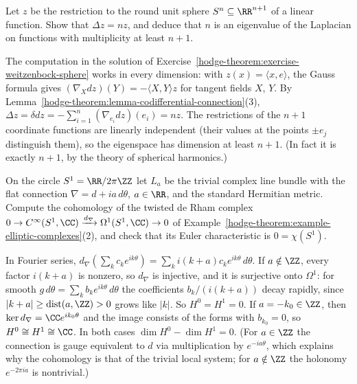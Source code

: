 \begin{exercise}\label{hodge-theorem:exercise-linear-functions-sphere}
Let $z$ be the restriction to the round unit sphere $S^n \subseteq \RR^{n+1}$ of a linear function. Show that $\Delta z = nz$, and deduce that $n$ is an eigenvalue of the Laplacian on functions with multiplicity at least
$n + 1$.
\end{exercise}

\begin{solution}
The computation in the solution of Exercise~\ref{hodge-theorem:exercise-weitzenbock-sphere} works in every dimension: with $z(x) = \langle x, e\rangle$, the Gauss formula gives $(\nabla_Xdz)(Y) = -\langle X, Y\rangle z$ for
tangent fields $X$, $Y$. By Lemma~\ref{hodge-theorem:lemma-codifferential-connection}(3), $\Delta z = \delta dz = -\sum_{i=1}^n(\nabla_{e_i}dz)(e_i) = nz$. The restrictions of the $n + 1$ coordinate functions are linearly
independent (their values at the points $\pm e_j$ distinguish them), so the eigenspace has dimension at least $n + 1$. (In fact it is exactly $n + 1$, by the theory of spherical harmonics.)
\end{solution}

\begin{exercise}\label{hodge-theorem:exercise-twisted-circle}
On the circle $S^1 = \RR/2\pi\ZZ$ let $L_a$ be the trivial complex line bundle with the flat connection $\nabla = d + ia\,d\theta$, $a \in \RR$, and the standard Hermitian metric. Compute the cohomology of the twisted
de Rham complex $0 \to C^\infty(S^1, \CC) \xrightarrow{d_\nabla} \Omega^1(S^1, \CC) \to 0$ of Example~\ref{hodge-theorem:example-elliptic-complexes}(2), and check that its Euler characteristic is $0 = \chi(S^1)$.
\end{exercise}

\begin{solution}
In Fourier series, $d_\nabla(\sum_kc_ke^{ik\theta}) = \sum_ki(k + a)c_ke^{ik\theta}\,d\theta$. If $a \notin \ZZ$, every factor $i(k + a)$ is nonzero, so $d_\nabla$ is injective, and it is surjective onto $\Omega^1$: for smooth
$g\,d\theta = \sum_kb_ke^{ik\theta}\,d\theta$ the coefficients $b_k/(i(k + a))$ decay rapidly, since $|k + a| \geq \operatorname{dist}(a, \ZZ) > 0$ grows like $|k|$. So $H^0 = H^1 = 0$. If $a = -k_0 \in \ZZ$, then
$\ker d_\nabla = \CC e^{ik_0\theta}$ and the image consists of the forms with $b_{k_0} = 0$, so $H^0 \cong H^1 \cong \CC$. In both cases $\dim H^0 - \dim H^1 = 0$. (For $a \in \ZZ$ the connection is gauge equivalent to $d$
via multiplication by $e^{-ia\theta}$, which explains why the cohomology is that of the trivial local system; for $a \notin \ZZ$ the holonomy $e^{-2\pi ia}$ is nontrivial.)
\end{solution}

